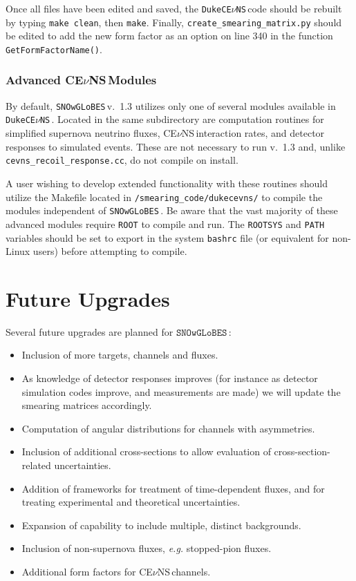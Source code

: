 \documentclass{article}
\newcommand{\cev}{CE$\nu$NS\,}
\newcommand{\snow}{\texttt{SNOwGLoBES}\,}
\newcommand{\dukecev}{\texttt{DukeCE$\nu$NS}\,}
\begin{document}
Once all files have been edited and saved, the \dukecev code should be rebuilt by typing \texttt{make clean}, then \texttt{make}. Finally, \texttt{create\_smearing\_matrix.py} should be edited to add the new form factor as an option on line 340 in the function \texttt{GetFormFactorName()}.


\subsubsection{Advanced \cev Modules}

By default, \snow v.~1.3 utilizes only one of several modules available in \dukecev. Located in the same subdirectory are computation routines for simplified supernova neutrino fluxes, \cev interaction rates, and detector responses to simulated events. These are not necessary to run v.~1.3 and, unlike \texttt{cevns\_recoil\_response.cc}, do not compile on install.

A user wishing to develop extended functionality with these routines should utilize the Makefile located in \texttt{/smearing\_code/dukecevns/} to compile the modules independent of \snow. Be aware that the vast majority of these advanced modules require \texttt{ROOT} to compile and run. The \texttt{ROOTSYS} and \texttt{PATH} variables should be set to export in the system \texttt{bashrc} file (or equivalent for non-Linux users) before attempting to compile.


\section{Future Upgrades} \label{sec:future}

Several future upgrades are planned for $\snow$:

\begin{itemize}
    \item Inclusion of more targets, channels and fluxes.
    \item As knowledge of detector responses improves (for instance as detector simulation codes improve, and measurements are made) we will update the smearing matrices accordingly.
    \item Computation of angular distributions for channels with asymmetries.
    \item Inclusion of additional cross-sections to allow evaluation of cross-section-related uncertainties.
    \item Addition of frameworks for treatment of time-dependent fluxes, and for treating experimental and theoretical uncertainties.
    \item Expansion of capability to include multiple, distinct backgrounds.
    \item Inclusion of non-supernova fluxes, \textit{e.g.} stopped-pion fluxes.
    \item Additional form factors for \cev channels.
\end{itemize}
\end{document}

